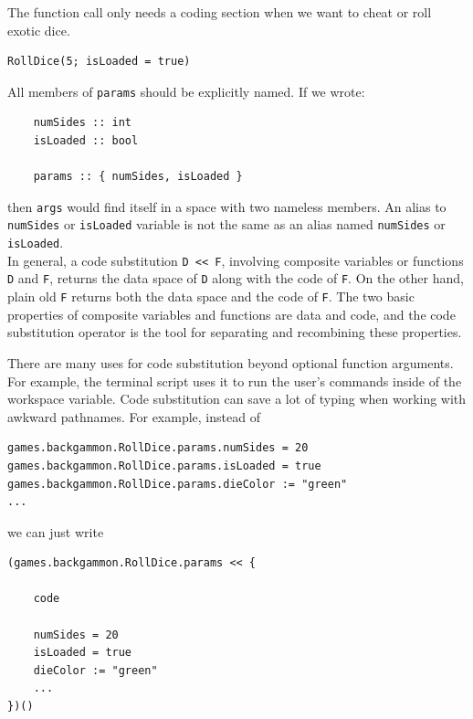 \documentclass{article}
\newenvironment{code}{
       \begin{list}{}{
               \setlength{\leftmargin}{.4in}
               \setlength{\rightmargin}{0in}
               \setlength{\topsep}{.2in}
       }
       \small
       \item[] }
       { \end{list}   }
\begin{document}
\noindent The function call only needs a coding section when we want to cheat or roll exotic dice.

\begin{code} \begin{verbatim}
RollDice(5; isLoaded = true)
\end{verbatim} \end{code}

All members of \verb#params# should be explicitly named.  If we wrote:

\begin{code} \begin{verbatim}
    numSides :: int
    isLoaded :: bool
    
    params :: { numSides, isLoaded }
\end{verbatim} \end{code}

\noindent then \verb#args# would find itself in a space with two nameless members.  An alias to \verb#numSides# or \verb#isLoaded# variable is not the same as an alias named \verb#numSides# or \verb#isLoaded#.\\


In general, a code substitution \verb#D << F#, involving composite variables or functions \verb#D# and \verb#F#, returns the data space of \verb#D# along with the code of \verb#F#.  On the other hand, plain old \verb#F# returns both the data space and the code of \verb#F#.  The two basic properties of composite variables and functions are data and code, and the code substitution operator is the tool for separating and recombining these properties.

There are many uses for code substitution beyond optional function arguments.  For example, the terminal script uses it to run the user's commands inside of the workspace variable.  Code substitution can save a lot of typing when working with awkward pathnames.  For example, instead of

\begin{code} \begin{verbatim}
games.backgammon.RollDice.params.numSides = 20
games.backgammon.RollDice.params.isLoaded = true
games.backgammon.RollDice.params.dieColor := "green"
...
\end{verbatim} \end{code}

\noindent we can just write

\begin{code} \begin{verbatim}
(games.backgammon.RollDice.params << {
    
    code
    
    numSides = 20
    isLoaded = true
    dieColor := "green"
    ...
})()
\end{verbatim} \end{code}
\end{document}
